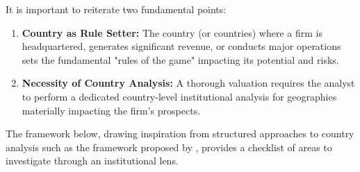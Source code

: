 It is important to reiterate two fundamental points:
\begin{enumerate}
    \item \textbf{Country as Rule Setter:} The country (or countries) where a firm is headquartered, generates significant revenue, or conducts major operations sets the fundamental "rules of the game" impacting its potential and risks.
    \item \textbf{Necessity of Country Analysis:} A thorough valuation requires the analyst to perform a dedicated country-level institutional analysis for geographies materially impacting the firm's prospects.
\end{enumerate}
The framework below, drawing inspiration from structured approaches to country analysis such as the framework proposed by \textcite{currie2012country}, provides a checklist of areas to investigate through an institutional lens.

